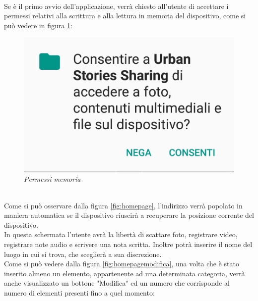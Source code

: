 \\Se è il primo avvio dell'applicazione, verrà chiesto all'utente di accettare i permessi relativi alla scrittura e alla lettura in memoria del dispositivo, come si può vedere in figura \ref{fig:permessimem}:
\begin{figure}[!h]
    \centering
	\includegraphics[scale=0.25]{Tesi/images/PermessiMemoria.jpg}
	\caption{\textit{Permessi memoria}}
	\label{fig:permessimem}
\end{figure}\pagebreak
\\Come si può osservare dalla figura \ref{fig:homepage}, l'indirizzo verrà popolato in maniera automatica se il dispositivo riuscirà a recuperare la posizione corrente del dispositivo.
\\In questa schermata l'utente avrà la libertà di scattare foto, registrare video, registrare note audio e scrivere una nota scritta. Inoltre potrà inserire il nome del luogo in cui si trova, che sceglierà a sua discrezione.
\\Come si può vedere dalla figura \ref{fig:homepagemodifica}, una volta che è stato inserito almeno un elemento, appartenente ad una determinata categoria, verrà anche visualizzato un bottone "Modifica" ed un numero che corrisponde al numero di elementi presenti fino a quel momento:
